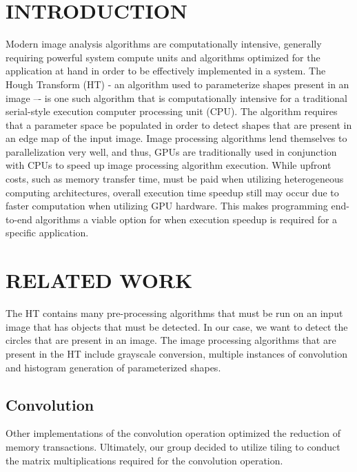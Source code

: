 \documentclass[12pt]{article}
\begin{document}
\section{\MakeUppercase{Introduction}}
\noindent
Modern image analysis algorithms are computationally intensive, generally requiring powerful system compute units and algorithms optimized for the application at hand in order to be effectively implemented in a system. 
The Hough Transform (HT)\cite{BALLARD1981111} - an algorithm used to parameterize shapes present in an image –- is one such algorithm that is computationally intensive for a traditional serial-style execution computer processing unit (CPU).
The algorithm requires that a parameter space be populated in order to detect shapes that are present in an edge map of the input image.
Image processing algorithms lend themselves to parallelization very well, and thus, GPUs are traditionally used in conjunction with CPUs to speed up image processing algorithm execution.
While upfront costs, such as memory transfer time, must be paid when utilizing heterogeneous computing architectures, overall execution time speedup still may occur due to faster computation when utilizing GPU hardware.
This makes programming end-to-end algorithms a viable option for when execution speedup is required for a specific application.

\section{\MakeUppercase{Related Work}}
\label{sec:relatedWork}
\noindent
The HT contains many pre-processing algorithms that must be run on an input image that has objects that must be detected.
In our case, we want to detect the circles that are present in an image.
The image processing algorithms that are present in the HT include grayscale conversion, multiple instances of convolution and histogram generation of parameterized shapes.

\subsection*{Convolution}
\label{sec:convolution}
\noindent
Other implementations \cite{9229640} of the convolution operation optimized the reduction of memory transactions.
Ultimately, our group decided to utilize tiling to conduct the matrix multiplications required for the convolution operation.
\end{document}
